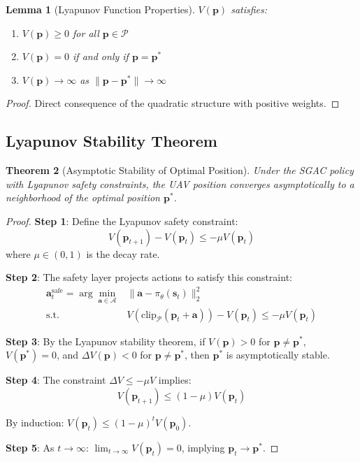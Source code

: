 \documentclass[11pt,a4paper]{article}
\newtheorem{theorem}{Theorem}[section]
\newtheorem{lemma}[theorem]{Lemma}
\newcommand{\calP}{\mathcal{P}}
\newcommand{\calA}{\mathcal{A}}
\newcommand{\bs}{\mathbf{s}}
\newcommand{\ba}{\mathbf{a}}
\newcommand{\bp}{\mathbf{p}}
\newcommand{\popt}{\mathbf{p}^*}
\begin{document}
\begin{lemma}[Lyapunov Function Properties]
$V(\bp)$ satisfies:
\begin{enumerate}
    \item $V(\bp) \geq 0$ for all $\bp \in \calP$
    \item $V(\bp) = 0$ if and only if $\bp = \popt$
    \item $V(\bp) \rightarrow \infty$ as $\|\bp - \popt\| \rightarrow \infty$
\end{enumerate}
\end{lemma}

\begin{proof}
Direct consequence of the quadratic structure with positive weights.
\end{proof}

\subsection{Lyapunov Stability Theorem}

\begin{theorem}[Asymptotic Stability of Optimal Position]
\label{thm:stability}
Under the SGAC policy with Lyapunov safety constraints, the UAV position converges asymptotically to a neighborhood of the optimal position $\popt$.
\end{theorem}

\begin{proof}
\textbf{Step 1}: Define the Lyapunov safety constraint:
\begin{equation}
    V(\bp_{t+1}) - V(\bp_t) \leq -\mu V(\bp_t)
\end{equation}
where $\mu \in (0, 1)$ is the decay rate.

\textbf{Step 2}: The safety layer projects actions to satisfy this constraint:
\begin{align}
    \ba^{\text{safe}}_t = \arg\min_{\ba \in \calA} &\|\ba - \pi_\theta(\bs_t)\|_2^2 \\
    \text{s.t. } &V(\text{clip}_\calP(\bp_t + \ba)) - V(\bp_t) \leq -\mu V(\bp_t)
\end{align}

\textbf{Step 3}: By the Lyapunov stability theorem, if $V(\bp) > 0$ for $\bp \neq \popt$, $V(\popt) = 0$, and $\Delta V(\bp) < 0$ for $\bp \neq \popt$, then $\popt$ is asymptotically stable.

\textbf{Step 4}: The constraint $\Delta V \leq -\mu V$ implies:
\begin{equation}
    V(\bp_{t+1}) \leq (1-\mu)V(\bp_t)
\end{equation}

By induction: $V(\bp_t) \leq (1-\mu)^t V(\bp_0)$.

\textbf{Step 5}: As $t \rightarrow \infty$: $\lim_{t \rightarrow \infty} V(\bp_t) = 0$, implying $\bp_t \rightarrow \popt$.
\end{proof}
\end{document}
